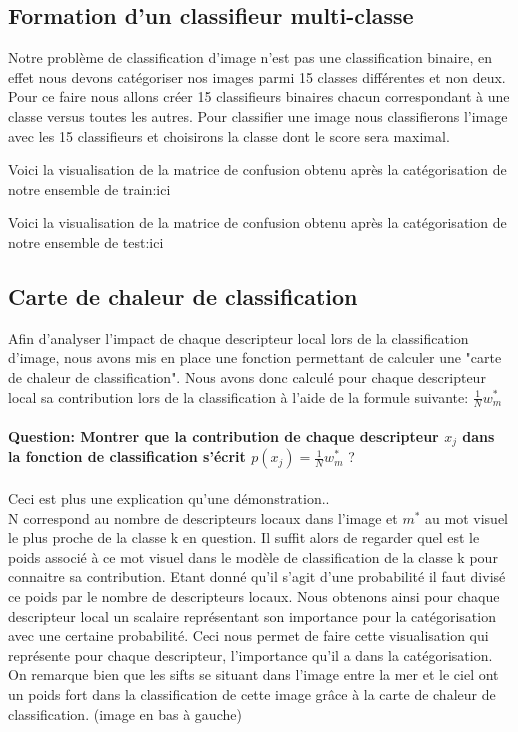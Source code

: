 \documentclass[a4paper]{article}
\begin{document}
\subsection{Formation d'un classifieur multi-classe}
Notre problème de classification d'image n'est pas une classification binaire, en effet nous devons catégoriser nos images parmi 15 classes différentes et non deux. Pour ce faire nous allons créer 15 classifieurs binaires chacun correspondant à une classe versus toutes les autres. Pour classifier une image nous classifierons l'image avec les 15 classifieurs et choisirons la classe dont le score sera maximal.

Voici la visualisation de la matrice de confusion obtenu après la catégorisation de notre ensemble de train:ici

Voici la visualisation de la matrice de confusion obtenu après la catégorisation de notre ensemble de test:ici
\subsection{Carte de chaleur de classification}
Afin d'analyser l'impact de chaque descripteur local lors de la classification d'image, nous avons mis en place une fonction permettant de calculer une "carte de chaleur de classification".  Nous avons donc calculé pour chaque descripteur local sa contribution lors de la classification à l'aide de la formule suivante:  $\frac{1}{N}  w_m^*$ \\\\
\textbf{Question: Montrer que la contribution de chaque descripteur $x_j$ dans la fonction de classification s'écrit $p(x_j) = \frac{1}{N}  w_m^*$} ?\\\\
Ceci est plus une explication qu'une démonstration..\\
N correspond au nombre de descripteurs locaux dans l'image et $m^*$ au mot visuel le plus proche de la classe k en question. Il suffit alors de regarder quel est le poids associé à ce mot visuel dans le modèle de classification de la classe k pour connaitre sa contribution. Etant donné qu'il s'agit d'une probabilité il faut divisé ce poids par le nombre de descripteurs locaux. Nous obtenons ainsi pour chaque descripteur local un scalaire représentant son importance pour la catégorisation avec une certaine probabilité. Ceci nous permet de faire cette visualisation qui représente pour chaque descripteur, l'importance qu'il a dans la catégorisation. \\
On remarque bien que les sifts se situant dans l'image entre la mer et le ciel ont un poids fort dans la classification de cette image grâce à la carte de chaleur de classification. (image en bas à gauche)\\
\end{document}
